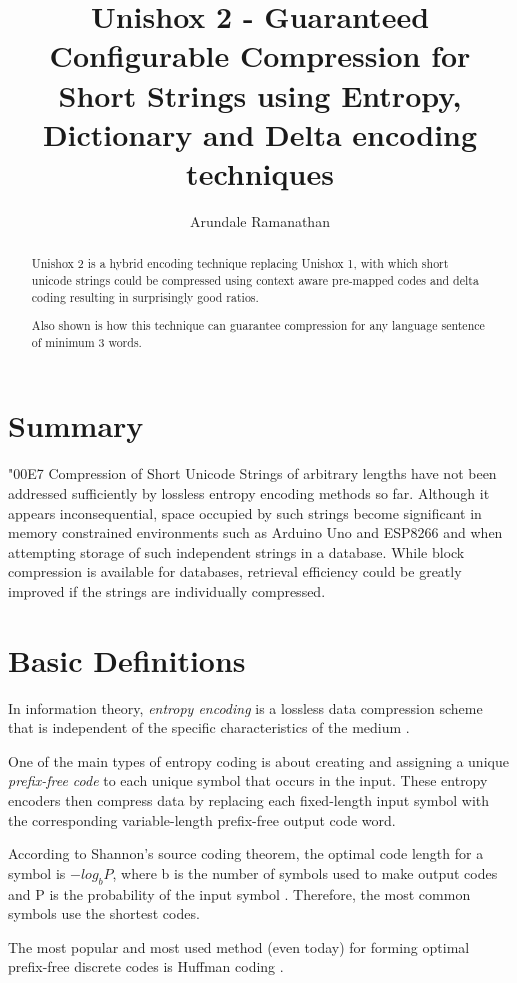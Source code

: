 \documentclass[]{article}
\title{Unishox 2 - Guaranteed Configurable Compression for Short Strings using Entropy, Dictionary and Delta encoding techniques}
\author{Arundale Ramanathan}
\begin{document}
\maketitle

\begin{abstract}
Unishox 2 is a hybrid encoding technique replacing Unishox 1, with which short unicode strings could be compressed using context aware pre-mapped codes and delta coding resulting in surprisingly good ratios.

Also shown is how this technique can guarantee compression for any language sentence of minimum 3 words.
\end{abstract}

\section{Summary}

\char"00E7 Compression of Short Unicode Strings of arbitrary lengths have not been addressed sufficiently by lossless entropy encoding methods so far.  Although it appears inconsequential, space occupied by such strings become significant in memory constrained environments such as Arduino Uno and ESP8266 and when attempting storage of such independent strings in a database. While block compression is available for databases, retrieval efficiency could be greatly improved if the strings are individually compressed.

\section{Basic Definitions}

In information theory, \emph{entropy encoding} is a lossless data compression scheme that is independent of the specific characteristics of the medium \cite{1}.

One of the main types of entropy coding is about creating and assigning a unique \emph{prefix-free code} to each unique symbol that occurs in the input. These entropy encoders then compress data by replacing each fixed-length input symbol with the corresponding variable-length prefix-free output code word.

According to Shannon's source coding theorem, the optimal code length for a symbol is $-log_bP$, where b is the number of symbols used to make output codes and P is the probability of the input symbol \cite{2}. Therefore, the most common symbols use the shortest codes.

The most popular and most used method (even today) for forming optimal prefix-free discrete codes is Huffman coding \cite{3}.
\end{document}
